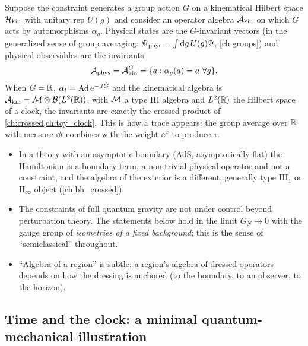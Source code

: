 Suppose the constraint generates a group action $G$ on a kinematical Hilbert space $\mathcal{H}_{\rm kin}$ with unitary rep $U(g)$ and consider an operator algebra $\mathcal{A}_{\rm kin}$ on which $G$ acts by automorphisms $\alpha_g$. Physical states are the $G$-invariant vectors (in the generalized sense of group averaging: $\Psi_{\rm phys}=\int\mathrm{d} g\,U(g)\Psi$, \cref{ch:groups}) and physical observables are the invariants
\begin{equation}
\mathcal{A}_{\rm phys}=\mathcal{A}_{\rm kin}^{G}=\{a:\alpha_g(a)=a\ \forall g\}.
\end{equation}
When $G=\mathbb{R}$, $\alpha_t=\operatorname{Ad}\mathrm{e}^{-\mathrm{i} t\hat G}$ and the kinematical algebra is $\mathcal{A}_{\rm kin}=\mathcal{M}\otimes\mathcal{B}(L^2(\mathbb{R}))$, with $\mathcal{M}$ a type III algebra and $L^2(\mathbb{R})$ the Hilbert space of a clock, the invariants are exactly the crossed product of \cref{ch:crossed,ch:toy_clock}. This is how a trace appears: the group average over $\mathbb{R}$ with measure $\dd t$ combines with the weight $\ee^{x}$ to produce $\tau$.

\begin{whatwrong}
\begin{itemize}
\item In a theory with an asymptotic boundary (AdS, asymptotically flat) the Hamiltonian is a boundary term, a non-trivial physical operator and not a constraint, and the algebra of the exterior is a different, generally type III$_1$ or II$_\infty$ object (\cref{ch:bh_crossed}).
\item The constraints of full quantum gravity are not under control beyond perturbation theory. The statements below hold in the limit $G_N\to0$ with the gauge group of \emph{isometries of a fixed background}; this is the sense of ``semiclassical'' throughout.
\item ``Algebra of a region'' is subtle: a region's algebra of dressed operators depends on how the dressing is anchored (to the boundary, to an observer, to the horizon).
\end{itemize}
\end{whatwrong}

\subsection{Time and the clock: a minimal quantum-mechanical illustration}

